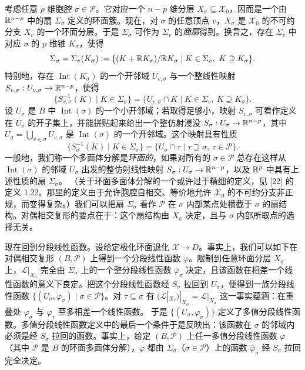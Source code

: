 考虑任意 $p$ 维胞腔 $\sigma\in\mathcal P$。它对应一个 $n-p$ 维分层 $X_\sigma\subseteq\mathcal X_0$，因而是一个由 $\mathbb{R}^{n-p}$ 中的扇 $\Sigma_\sigma$ 定义的环面簇。现在，对 $\sigma$ 的任意顶点 $v$，$X_\sigma$ 是 $\mathcal X_0$ 的不可约分支 $X_v$ 的一个环面分层。于是 $\Sigma_\sigma$ 可作为 $\Sigma_v$ 的\emph{商扇}得到。换言之，存在 $\Sigma_v$ 中对应 $\sigma$ 的 $p$ 维锥 $K_\sigma$，使得
\[
\Sigma_\sigma=\Sigma_v(K_\sigma):=\{(K+\mathbb{R} K_\sigma)/\mathbb{R} K_\sigma\mid K\in\Sigma_v,\ K\supseteq K_\sigma\}.
\]
特别地，存在 $\operatorname{Int}(K_\sigma)$ 的一个开邻域 $U_{v,\sigma}$ 与一个整线性映射 $S_{v,\sigma}:U_{v,\sigma}\to\mathbb{R}^{n-p}$，使得
\[
\{S_{v,\sigma}^{-1}(K)\mid K\in\Sigma_\sigma\}=\{U_{v,\sigma}\cap K\mid K\in\Sigma_v,\ K\supseteq K_\sigma\}.
\]
设 $U_\sigma$ 是 $B$ 中 $\operatorname{Int}(\sigma)$ 的一个小开邻域；若取得足够小，映射 $S_{v,\sigma}$ 可看作定义在 $U_\sigma$ 的开子集上，并能拼贴起来给出一个整仿射浸没 $S_\sigma:U_\sigma\to\mathbb{R}^{n-p}$，其中 $U_\sigma=\bigcup_{v\in\sigma}U_{v,\sigma}$ 是 $\operatorname{Int}(\sigma)$ 的一个开邻域。这个映射具有性质
\[
\{S_\sigma^{-1}(K)\mid K\in\Sigma_\sigma\}=\{U_\sigma\cap\tau\mid \tau\supseteq\sigma,\ \tau\in\mathcal P\}.
\]
一般地，我们称一个多面体分解是\emph{环面的}，如果对所有的 $\sigma\in\mathcal P$ 总存在这样从 $\operatorname{Int}(\sigma)$ 的邻域 $U_\sigma$ 出发的整仿射线性映射 $S_\sigma:U_\sigma\to\mathbb{R}^{n-p}$，以及 $\mathbb{R}^p$ 中具有上述性质的扇 $\Sigma_\sigma$。
（关于环面多面体分解的一个或许过于精细的定义，见 [22] 的定义 1.22。那里的定义由于允许胞腔自相交、等价地允许 $\mathcal X_0$ 的不可约分支非正规，而变得复杂。）我们可以把扇 $\Sigma_\sigma$ 看作 $\mathcal P$ 在 $\sigma$ 内部某点处横截于 $\sigma$ 的扇结构。对偶相交复形的要点在于：这个扇结构由 $X_\sigma$ 决定，且与 $\sigma$ 内部所取点的选择无关。

现在回到分段线性函数。设给定极化环面退化 $\mathcal X\to D$。事实上，我们可以如下在对偶相交复形 $(B,\mathcal P)$ 上得到一个分段线性函数 $\varphi$。限制到任意环面分层 $X_\sigma$ 上，$\mathcal L|_{X_\sigma}$ 完全由 $\Sigma_\sigma$ 上的一个整分段线性函数 $\bar\varphi_\sigma$ 决定，且该函数在相差一个线性函数的意义下良定。把这个分段线性函数经 $S_\sigma$ 拉回到 $U_\sigma$，便得到一族分段线性函数 $\{(U_\sigma,\varphi_\sigma)\mid\sigma\in\mathcal P\}$。对 $\tau\subseteq\sigma$ 有 $(\mathcal L|_{X_\tau})|_{X_\sigma}=\mathcal L|_{X_\sigma}$ 这一事实蕴涵：在重叠处 $\varphi_\sigma$ 与 $\varphi_\tau$ 至多相差一个线性函数。
于是 $\{(U_\sigma,\varphi_\sigma)\}$ 定义了多值分段线性函数。多值分段线性函数定义中的最后一个条件于是反映出：该函数在 $\sigma$ 的邻域内必须是经 $S_\sigma$ 拉回的函数。事实上，给定 $(B,\mathcal P)$ 上任一多值分段线性函数 $\varphi$（其中 $\mathcal P$ 是 $B$ 的环面多面体分解），$\varphi$ 都由 $\Sigma_\sigma$（$\sigma\in\mathcal P$）上的函数 $\bar\varphi_\sigma$ 经 $S_\sigma$ 拉回完全决定。

